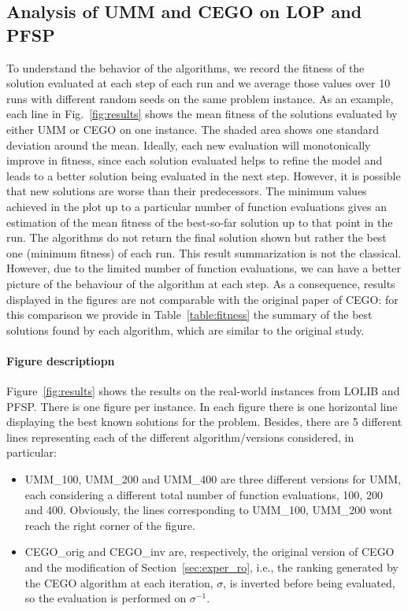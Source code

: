 \documentclass[sigconf,dvipsnames]{acmart}
\begin{document}
\subsection{Analysis of UMM and CEGO on LOP and PFSP}
To  understand the behavior of the algorithms, we record the fitness of
the solution evaluated at each step of each run and we average those values
over 10 runs with different random seeds on the same problem instance.  As an
example, each line in Fig.~\ref{fig:results} shows the mean fitness of the
solutions evaluated by either UMM or CEGO on one instance. The
shaded area shows one standard deviation around the mean. Ideally, each new
evaluation will monotonically improve in fitness, since each solution evaluated
helps to refine the model and leads to a better solution being evaluated in the
next step.  However, it is possible that new solutions are worse
than their predecessors. %
The minimum values
achieved in the plot up to a particular number of function evaluations gives an
estimation of the mean fitness of the best-so-far solution up to that point in
the run. The algorithms do not return the final solution shown but rather the
best one (minimum fitness) of each run. This result summarization is not the classical. However, due to the limited number of function evaluations, we can have a better picture of the behaviour of the algorithm at each step. As a consequence, results displayed in the figures are not comparable with the original paper of CEGO: for this comparison we provide in Table~\ref{table:fitness} the summary of the best solutions found by each algorithm, which are similar to the original study. 

\paragraph{Figure descriptiopn} Figure~\ref{fig:results} shows the results on the real-world instances from LOLIB and PFSP. There is one figure per instance. In each figure there is one horizontal line displaying the best known solutions for the problem. Besides, there are 5 different lines representing each of the different algorithm/versions considered, in particular:
\begin{itemize}
\item UMM\_100, UMM\_200 and UMM\_400 are three different versions for UMM, each considering a different total number of function evaluations, 100, 200 and 400. Obviously, the lines corresponding to UMM\_100, UMM\_200 wont reach the right corner of the figure. 
\item CEGO\_orig and CEGO\_inv are, respectively, the original version of CEGO and the modification of Section~\ref{sec:exper_ro}, i.e., the ranking generated by the CEGO algorithm at each iteration, $\sigma$, is inverted before being evaluated, so the evaluation is performed on $\sigma^{-1}$. 
\end{itemize}
\end{document}
